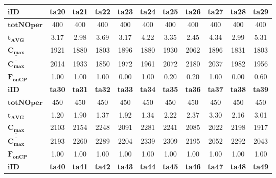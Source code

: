 \documentclass[printmode,oneside]{mgr}
\begin{document}
\begin{table}[!ht]
\renewcommand{\arraystretch}{1.2}
\begin{tabularx}{\textwidth}{|X|c|c|c|c|c|c|c|c|c|c|}
\hline
$\mathbf{iID}$ & \textbf{ta20} & \textbf{ta21} & \textbf{ta22} & \textbf{ta23} & \textbf{ta24} & \textbf{ta25} & \textbf{ta26} & \textbf{ta27} & \textbf{ta28} & \textbf{ta29}\\
\hline
$\mathbf{totNOper}$ & 400 & 400 & 400 & 400 & 400 & 400 & 400 & 400 & 400 & 400\\
\hline
$\mathbf{t_{AVG}}$ & 3.17 & 2.98 & 3.69 & 3.17 & 4.22 & 3.35 & 2.45 & 4.34 & 2.99 & 5.31\\
\hline
$\mathbf{\underline{C_{max}}}$ & 1921 & 1880 & 1803 & 1896 & 1880 & 1930 & 2062 & 1896 & 1831 & 1803\\
\hline
$\mathbf{\overline{C_{max}}}$ & 2014 & 1933 & 1850 & 1972 & 1961 & 2072 & 2180 & 2037 & 1982 & 1956\\
\hline
$\mathbf{F_{onCP}}$ & 1.00 & 1.00 & 1.00 & 0.00 & 1.00 & 0.20 & 0.20 & 1.00 & 0.00 & 0.60\\
\hline
\hline
$\mathbf{iID}$ & \textbf{ta30} & \textbf{ta31} & \textbf{ta32} & \textbf{ta33} & \textbf{ta34} & \textbf{ta35} & \textbf{ta36} & \textbf{ta37} & \textbf{ta38} & \textbf{ta39}\\
\hline
$\mathbf{totNOper}$ & 450 & 450 & 450 & 450 & 450 & 450 & 450 & 450 & 450 & 450\\
\hline
$\mathbf{t_{AVG}}$ & 1.20 & 1.90 & 1.37 & 1.92 & 1.34 & 2.22 & 2.37 & 3.30 & 2.16 & 3.01\\
\hline
$\mathbf{\underline{C_{max}}}$ & 2103 & 2154 & 2248 & 2091 & 2281 & 2241 & 2085 & 2022 & 2198 & 1917\\
\hline
$\mathbf{\overline{C_{max}}}$ & 2193 & 2260 & 2289 & 2204 & 2339 & 2309 & 2195 & 2052 & 2292 & 2043\\
\hline
$\mathbf{F_{onCP}}$ & 1.00 & 1.00 & 1.00 & 1.00 & 1.00 & 1.00 & 1.00 & 1.00 & 1.00 & 1.00\\
\hline
\hline
$\mathbf{iID}$ & \textbf{ta40} & \textbf{ta41} & \textbf{ta42} & \textbf{ta43} & \textbf{ta44} & \textbf{ta45} & \textbf{ta46} & \textbf{ta47} & \textbf{ta48} & \textbf{ta49}\\

\end{tabularx}
\end{table}
\end{document}
